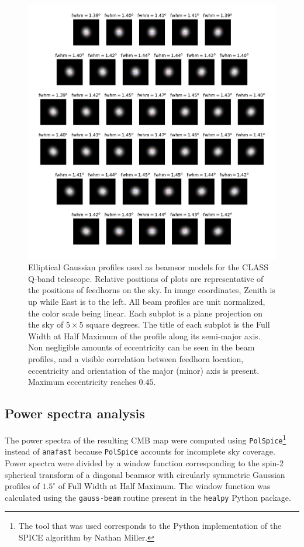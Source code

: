 \documentclass[a4paper,fleqn]{cas-dc}\sloppy
\begin{document}
\begin{figure}
	\centering
	\includegraphics[width=1.0 \linewidth]{figures/qband_beams_main_beam_fwhm_x}
	\caption{Elliptical Gaussian profiles used as beamsor models for the CLASS Q-band telescope. Relative positions of plots are representative of the positions of feedhorns on the sky. In image coordinates, Zenith is up while East is to the left. All beam profiles are unit normalized, the color scale being linear. Each subplot is a plane projection on the sky of $5\times5$ square degrees. The title of each subplot is the Full Width at Half Maximum of the profile along its semi-major axis. Non negligible amounts of eccentricity can be seen in the beam profiles, and a visible correlation between feedhorn location, eccentricity and orientation of the major (minor) axis is present. Maximum eccentricity reaches $0.45$.}
	\label{fig::qbandbeamsmainbeamfwhmx}
\end{figure}

\subsection{Power spectra analysis}

The power spectra of the resulting CMB map were computed using \texttt{PolSpice}\footnote{The tool that was used corresponds to the Python implementation of the SPICE algorithm by Nathan Miller.} instead of \texttt{anafast} because \texttt{PolSpice} accounts for incomplete sky coverage. Power spectra were divided by a window function corresponding to the spin-2 spherical transform of a diagonal beamsor with circularly symmetric Gaussian profiles of $1.5^\circ$ of Full Width at Half Maximum. The window function was calculated using the \texttt{gauss-beam} routine present in the \texttt{healpy} Python package.
\end{document}
